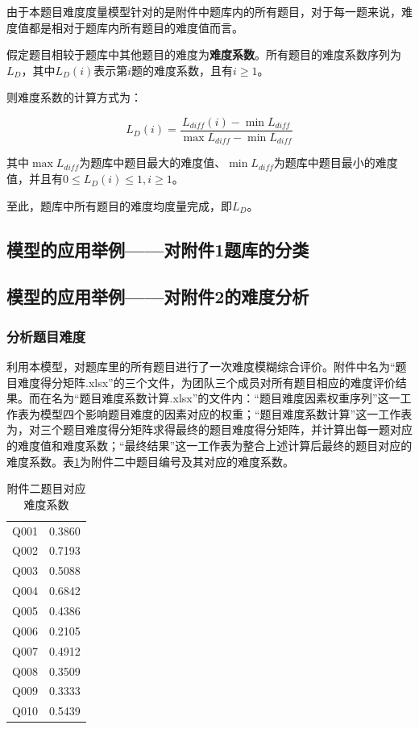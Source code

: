 由于本题目难度度量模型针对的是附件中题库内的所有题目，对于每一题来说，难度值都是相对于题库内所有题目的难度值而言。

假定题目相较于题库中其他题目的难度为\textbf{难度系数}。所有题目的难度系数序列为$L_D$，其中$L_D(i)$表示第$i$题的难度系数，且有$i \geq 1$。

则难度系数的计算方式为：

\begin{equation}
L_D(i) = 
    \frac{
        L_{diff}(i) - \min L_{diff}
    } {
        \max L_{diff} - \min L_{diff}
    }
\end{equation}

其中$\max L_{diff}$为题库中题目最大的难度值、$\min L_{diff}$为题库中题目最小的难度值，并且有$0 \leq L_D(i) \leq 1, i \geq 1$。

至此，题库中所有题目的难度均度量完成，即$L_D$。

\subsection{模型的应用举例——对附件1题库的分类}



\subsection{模型的应用举例——对附件2的难度分析}

\subsubsection{分析题目难度}

利用本模型，对题库里的所有题目进行了一次难度模糊综合评价。附件中名为“题目难度得分矩阵.xlsx”的三个文件，为团队三个成员对所有题目相应的难度评价结果。而在名为“题目难度系数计算.xlsx”的文件内：“题目难度因素权重序列”这一工作表为模型四个影响题目难度的因素对应的权重；“题目难度系数计算”这一工作表为，对三个题目难度得分矩阵求得最终的题目难度得分矩阵，并计算出每一题对应的难度值和难度系数；“最终结果”这一工作表为整合上述计算后最终的题目对应的难度系数。表\ref{tableDiff}为附件二中题目编号及其对应的难度系数。

\begin{table}[htbp]
    \centering
    \label{tableDiff}
    \caption{附件二题目对应难度系数}
    \begin{tabular}{@{}cc@{}}
    \toprule
    \quad\quad\quad\quad{}\quad\quad\quad\quad\quad & \quad\quad\quad\quad{}\quad\quad\quad\quad\quad\\ \midrule
    Q001 & 0.3860 \\
    Q002 & 0.7193 \\
    Q003 & 0.5088 \\
    Q004 & 0.6842 \\
    Q005 & 0.4386 \\
    Q006 & 0.2105 \\
    Q007 & 0.4912 \\
    Q008 & 0.3509 \\
    Q009 & 0.3333 \\
    Q010 & 0.5439 \\ \bottomrule
    \end{tabular}
\end{table}

